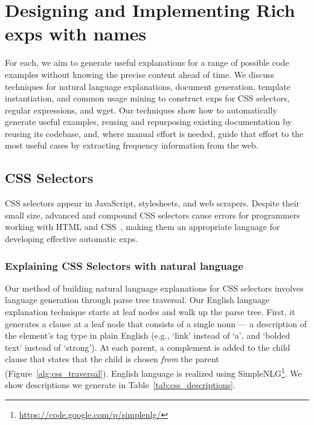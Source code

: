 \section{Designing and Implementing Rich \Glspl{exp} with \Glspl{name}}

For each, we aim to generate useful explanations for a range of possible code examples without knowing the precise content ahead of time. 
We discuss techniques for natural language explanations, document generation, template instantiation, and common usage mining to construct \glspl{exp} for CSS selectors, regular expressions, and wget.
 Our techniques show how to automatically generate useful examples, reusing and repurposing existing documentation by reusing its codebase, and, where manual effort is needed, guide that effort to the most useful cases by extracting frequency information from the web. \fi

\subsection{CSS Selectors}

CSS selectors appear in JavaScript, stylesheets, and web scrapers.
Despite their small size, advanced and compound CSS selectors cause errors for programmers working with HTML and CSS~\cite{park_towards_2013}, making them an appropriate language for developing effective automatic \glspl{exp}.

\subsubsection{Explaining CSS Selectors with natural language}

Our method of building natural language explanations for CSS selectors involves language generation through parse tree traversal.
Our English language explanation technique starts at leaf nodes and walk up the parse tree.
First, it generates a clause at a leaf node that consists of a single noun --- a description of the element's tag type in plain English (e.g., `link' instead of `a', and `bolded text' instead of `strong').
At each parent, a complement is added to the child clause that states that the child is chosen \emph{from} the parent (Figure~\ref{alg:css_traversal}).
English language is realized using SimpleNLG\footnote{\url{https://code.google.com/p/simplenlg/}}.
We show descriptions we generate in Table~\ref{tab:css_descriptions}.


